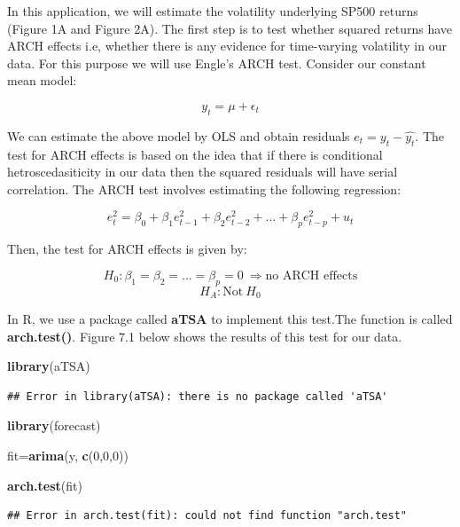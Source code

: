 \documentclass[]{book}
\newenvironment{Shaded}{\begin{snugshade}}{\end{snugshade}}
\newcommand{\DecValTok}[1]{\textcolor[rgb]{0.00,0.00,0.81}{#1}}
\newcommand{\KeywordTok}[1]{\textcolor[rgb]{0.13,0.29,0.53}{\textbf{#1}}}
\newcommand{\NormalTok}[1]{#1}
\theoremstyle{definition}
\theoremstyle{definition}
\theoremstyle{definition}
\theoremstyle{remark}
\begin{document}
In this application, we will estimate the volatility underlying SP500 returns (Figure 1A and Figure 2A). The first step is to test whether squared returns have ARCH effects i.e, whether there is any evidence for time-varying volatility in our data. For this purpose we will use Engle's ARCH test. Consider our constant mean model:

\[y_t=\mu +\epsilon_t\]

We can estimate the above model by OLS and obtain residuals \(e_t=y_t-\hat{y_t}\). The test for ARCH effects is based on the idea that if there is conditional hetroscedasiticity in our data then the squared residuals will have serial correlation. The ARCH test involves estimating the following regression:

\[e^2_t= \beta_0 +\beta_1 e^2_{t-1} + \beta_2 e^2_{t-2}+...+ \beta_p e^2_{t-p} + u_t\]

Then, the test for ARCH effects is given by:

\[H_0: \beta_1=\beta_2=...=\beta_p=0 \ \Rightarrow \text{no ARCH effects}\]
\[ H_A: \text{Not} \ H_0\]

In R, we use a package called \textbf{aTSA} to implement this test.The function is called \textbf{arch.test()}. Figure 7.1 below shows the results of this test for our data.

\begin{Shaded}
\begin{Highlighting}[]
\KeywordTok{library}\NormalTok{(aTSA)}
\end{Highlighting}
\end{Shaded}

\begin{verbatim}
## Error in library(aTSA): there is no package called 'aTSA'
\end{verbatim}

\begin{Shaded}
\begin{Highlighting}[]
\KeywordTok{library}\NormalTok{(forecast)}

\NormalTok{fit=}\KeywordTok{arima}\NormalTok{(y, }\KeywordTok{c}\NormalTok{(}\DecValTok{0}\NormalTok{,}\DecValTok{0}\NormalTok{,}\DecValTok{0}\NormalTok{))}

\KeywordTok{arch.test}\NormalTok{(fit)}
\end{Highlighting}
\end{Shaded}

\begin{verbatim}
## Error in arch.test(fit): could not find function "arch.test"
\end{verbatim}
\end{document}
